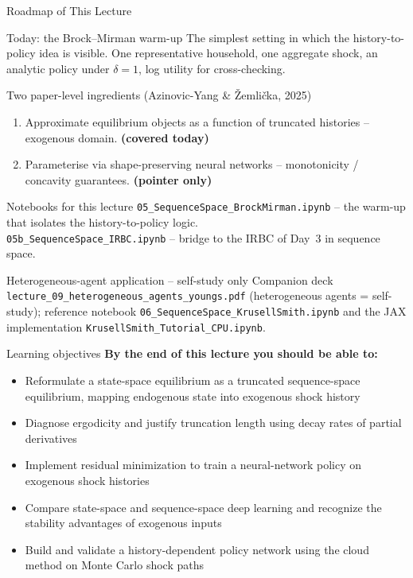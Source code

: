\documentclass[aspectratio=169,11pt]{beamer}
\newcommand{\emphc}[1]{\textcolor{harvardcrimson}{#1}}
\begin{document}
\begin{frame}[shrink=10]{Roadmap of This Lecture}
\small
\begin{block}{Today: the Brock--Mirman warm-up}
The simplest setting in which the history-to-policy idea is visible. One representative household, one aggregate shock, an analytic policy under $\delta=1$, log utility for cross-checking.
\end{block}

\begin{block}{Two paper-level ingredients (Azinovic-Yang \& \v{Z}emli\v{c}ka, 2025)}
\begin{enumerate}\itemsep1pt
    \item Approximate equilibrium objects as a function of \emphc{truncated histories} -- exogenous domain. \;\textbf{(covered today)}
    \item Parameterise via \emphc{shape-preserving neural networks} -- monotonicity / concavity guarantees. \;\textbf{(pointer only)}
\end{enumerate}
\end{block}

\begin{block}{Notebooks for this lecture}
\texttt{05\_SequenceSpace\_BrockMirman.ipynb} -- the warm-up that isolates the history-to-policy logic.\\
\texttt{05b\_SequenceSpace\_IRBC.ipynb} -- bridge to the IRBC of Day~3 in sequence space.
\end{block}

\begin{block}{Heterogeneous-agent application -- self-study only}
Companion deck \texttt{lecture\_09\_heterogeneous\_agents\_youngs.pdf} (heterogeneous agents = self-study); reference notebook \texttt{06\_SequenceSpace\_KrusellSmith.ipynb} and the JAX implementation \texttt{KrusellSmith\_Tutorial\_CPU.ipynb}.
\end{block}
\end{frame}

\begin{frame}{Learning objectives}
\textbf{By the end of this lecture you should be able to:}
\begin{itemize}
  \item Reformulate a state-space equilibrium as a truncated sequence-space equilibrium, mapping endogenous state into exogenous shock history
  \item Diagnose ergodicity and justify truncation length using decay rates of partial derivatives
  \item Implement residual minimization to train a neural-network policy on exogenous shock histories
  \item Compare state-space and sequence-space deep learning and recognize the stability advantages of exogenous inputs
  \item Build and validate a history-dependent policy network using the cloud method on Monte Carlo shock paths
\end{itemize}
\end{frame}
\end{document}

